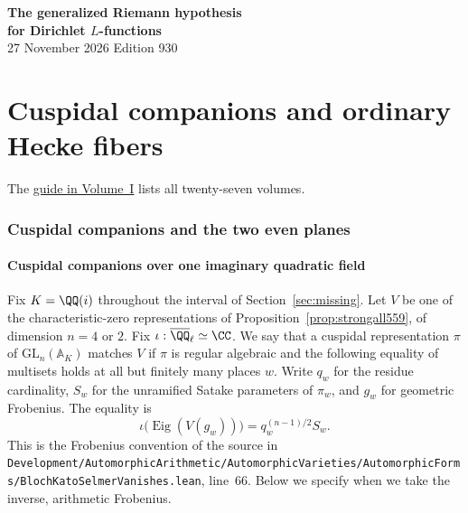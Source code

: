 \documentclass[a4paper,11pt]{article}
\theoremstyle{definition}
\theoremstyle{remark}
\newcommand{\srcloc}[2]{{\small\nolinkurl{#1.lean}}, line~#2}
\numberwithin{equation}{section}
\begin{document}
\setcounter{part}{11}
\thispagestyle{plain}\begin{center}
{\LARGE\bfseries The generalized Riemann hypothesis\\[2pt]for Dirichlet \(L\)-functions}\\[6pt]
{\small 27 November 2026 \quad\textperiodcentered\quad Edition 930}\end{center}
\part{Cuspidal companions and ordinary Hecke fibers}\label{part:XII}
\begin{abstract}\noindent We construct cuspidal points on auxiliary towers from quadratic induction and symmetric cubes. At the prescribed weights we study their traces, their Hecke fibers and the dual Selmer conditions on these families.\end{abstract}
\setcounter{section}{58}
\noindent The \hyperref[seriesguide]{guide in Volume~I} lists all twenty-seven volumes.
\begingroup\small\setlength{\parskip}{0pt}\tableofcontents\endgroup
\clearpage

\section{Cuspidal companions and the two even planes}\label{nav:chapter-companions-even-planes}\label{nav:volume-XII}

\subsection{Cuspidal companions over one imaginary quadratic field}
\label{sec:onerealization560}

Fix \(K=\QQ(i)\) throughout the interval of Section~\ref{sec:missing}.
Let \(V\) be one of the characteristic-zero representations of
Proposition~\ref{prop:strongall559}, of dimension \(n=4\) or \(2\).
Fix \(\iota:\overline{\QQ}_\ell\simeq\CC\). We say that a
cuspidal representation \(\pi\) of \(\mathrm{GL}_n(\mathbb A_K)\)
matches \(V\) if \(\pi\) is regular algebraic and the following
equality of multisets holds at all but finitely many places \(w\).
Write \(q_w\) for the residue cardinality, \(S_w\) for the
unramified Satake parameters of \(\pi_w\), and \(g_w\) for
geometric Frobenius. The equality is
\[
       \iota\big(\operatorname{Eig}(V(g_w))\big)
                             =q_w^{(n-1)/2}S_w .
\]
This is the Frobenius convention of the source in
\srcloc{Development/AutomorphicArithmetic/AutomorphicVarieties/AutomorphicForms/BlochKatoSelmerVanishes}{66}.
Below we specify when we take the inverse, arithmetic Frobenius.
\end{document}
